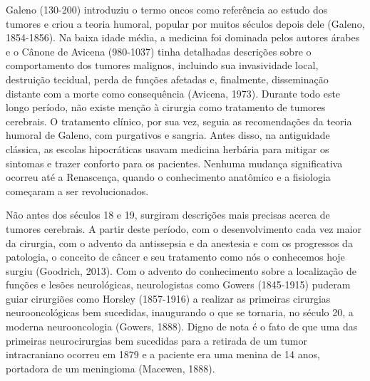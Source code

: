 \documentclass[11pt,a4paper,oldfontcommands]{memoir}
\begin{document}
Galeno (130-200) introduziu o termo oncos como referência ao estudo dos tumores e criou a teoria humoral, popular por muitos séculos depois dele (Galeno, 1854-1856). Na baixa idade média, a medicina foi dominada pelos autores árabes e o Cânone de Avicena (980-1037) tinha detalhadas descrições sobre o comportamento dos tumores malignos, incluindo sua invasividade local, destruição tecidual, perda de funções afetadas e, finalmente, disseminação distante com a morte como consequência (Avicena, 1973). Durante todo este longo período, não existe menção à cirurgia como tratamento de tumores cerebrais. O tratamento clínico, por sua vez, seguia as recomendações da teoria humoral de Galeno, com purgativos e sangria. Antes disso, na antiguidade clássica, as escolas hipocráticas usavam medicina herbária para mitigar os sintomas e trazer conforto para os pacientes. Nenhuma mudança significativa ocorreu até a Renascença, quando o conhecimento anatômico e a fisiologia começaram a ser revolucionados. 

Não antes dos séculos 18 e 19, surgiram descrições mais precisas acerca de tumores cerebrais. A partir deste período, com o desenvolvimento cada vez maior da cirurgia, com o advento da antissepsia e da anestesia e com os progressos da patologia, o conceito de câncer e seu tratamento como nós o conhecemos hoje surgiu (Goodrich, 2013). Com o advento do conhecimento sobre a localização de funções e lesões neurológicas, neurologistas como Gowers (1845-1915) puderam guiar cirurgiões como Horsley (1857-1916) a realizar as primeiras cirurgias neurooncológicas bem sucedidas, inaugurando o que se tornaria, no século 20, a moderna neurooncologia (Gowers, 1888). Digno de nota é o fato de que uma das primeiras neurocirurgias bem sucedidas para a retirada de um tumor intracraniano ocorreu em 1879 e a paciente era uma menina de 14 anos, portadora de um meningioma (Macewen, 1888).
\end{document}
